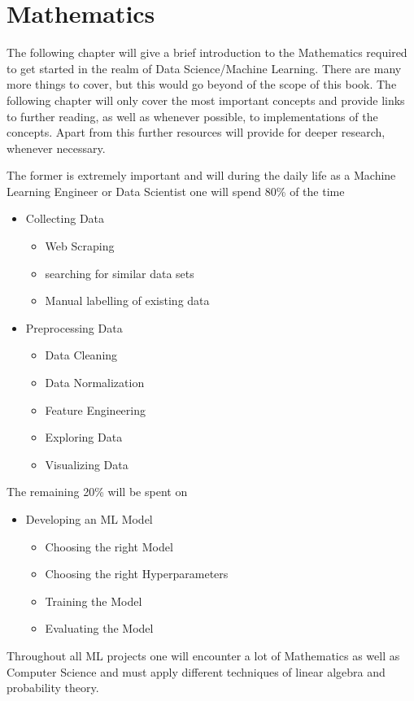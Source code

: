 \chapter{Mathematics}
\label{ch:math}
The following chapter will give a brief introduction to the Mathematics required to get started in the realm of Data Science/Machine Learning.
There are many more things to cover, but this would go beyond of the scope of this book. The following chapter will only cover the most important concepts and provide links to further reading, as well as whenever possible, to implementations of the concepts. 
Apart from this further resources will provide for deeper research, whenever necessary.

The former is extremely important and will during the daily life as a Machine Learning Engineer or Data Scientist one will spend 80\% of the time 
\begin{itemize}
  \item Collecting Data
  \begin{itemize}
    \item Web Scraping
    \item searching for similar data sets
    \item Manual labelling of existing data
  \end{itemize}
  \item Preprocessing Data
  \begin{itemize}
    \item Data Cleaning
    \item Data Normalization
    \item Feature Engineering
    \item Exploring Data
    \item Visualizing Data
  \end{itemize}
\end{itemize}

The remaining 20\% will be spent on
\begin{itemize}
  \item Developing an ML Model
  \begin{itemize}
    \item Choosing the right Model
    \item Choosing the right Hyperparameters
    \item Training the Model
    \item Evaluating the Model
  \end{itemize}
\end{itemize}
Throughout all ML projects one will encounter a lot of Mathematics as well as Computer Science and must apply different techniques of linear algebra and probability theory.

